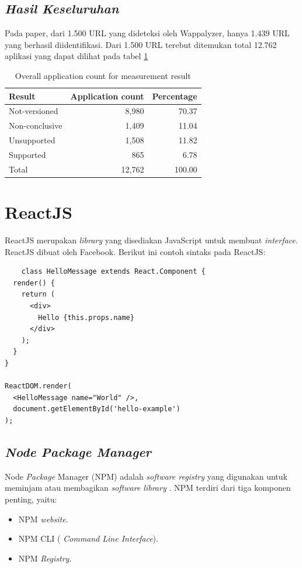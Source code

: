 \subsection{\textit{Hasil Keseluruhan}}
Pada paper\cite{pascal}, dari 1.500 URL yang dideteksi oleh Wappalyzer, hanya 1.439 URL yang berhasil diidentifikasi. Dari 1.500 URL terebut ditemukan total 12.762 aplikasi yang dapat dilihat pada tabel \ref{table:apr}
\begin{table}[h!]
\centering
\begin{tabular}{lrr} 
 \hline
 \textbf{Result} & \textbf{Application count} & \textbf{Percentage}\\
 \hline
 Not-versioned & 8,980 & 70.37\\
 Non-conclusive & 1,409 & 11.04\\
 Unsupported & 1,508 & 11.82\\
 Supported & 865 & 6.78\\
 \hline
 Total & 12,762 & 100.00\\
 \hline

\end{tabular}
\caption{Overall application count for measurement result}
\label{table:apr}
\end{table}

\section{ReactJS}
ReactJS merupakan \textit{library} yang disediakan JavaScript untuk membuat \textit{interface}. ReactJS dibuat oleh Facebook. Berikut ini contoh sintaks pada ReactJS:
\begin{lstlisting}
    class HelloMessage extends React.Component {
  render() {
    return (
      <div>
        Hello {this.props.name}
      </div>
    );
  }
}

ReactDOM.render(
  <HelloMessage name="World" />,
  document.getElementById('hello-example')
);
\end{lstlisting}

\subsection{\textit{Node Package Manager}}
Node \textit{Package} Manager (NPM) adalah \textit{software registry} yang digunakan untuk meminjam atau membagikan \textit{software library} \cite{npmAbout}. NPM terdiri dari tiga komponen penting, yaitu:
\begin{itemize}
    \item NPM \textit{website}.
    \item NPM CLI ( \textit{Command Line Interface}). 
    \item NPM \textit{Registry}.
\end{itemize}

